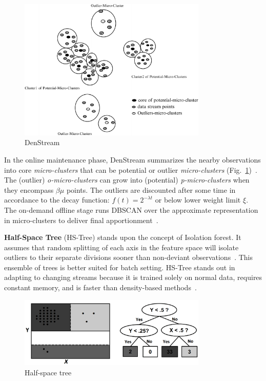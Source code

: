 \begin{figure}[ht]
    \centering
    \includegraphics[width=0.8\textwidth]{assets/analysis/DenStream.png}
    \caption{DenStream~\cite{amini_density_2012}}
    \label{fig:denstream}
\end{figure}

In the online maintenance phase, DenStream summarizes the nearby observations into core \emph{micro-clusters} that can be potential or outlier \emph{micro-clusters} (Fig.~\ref{fig:denstream})~\cite{ghesmoune_state---art_2016}. The (outlier) \emph{o-micro-clusters} can grow into (potential) \emph{p-micro-clusters} when they encompass $\beta \mu$ points. The outliers are discounted after some time in accordance to the decay function: $f(t) = 2^{-\lambda t}$ or below lower weight limit $\xi$. The on-demand offline stage runs DBSCAN over the approximate representation in micro-clusters to deliver final apportionment~\cite{cao_density-based_2006}.
\bigbreak

\textbf{Half-Space Tree} (HS-Tree) stands upon the concept of Isolation forest. It assumes that random splitting of each axis in the feature space will isolate outliers to their separate divisions sooner than non-deviant observations~\cite{gervasi_anomaly_2020,torres_automatic_2022}. This ensemble of trees is better suited for batch setting. HS-Tree stands out in adapting to changing streams because it is trained solely on normal data, requires constant memory, and is faster than density-based methods~\cite{tan_fast_2011}.

\begin{figure}[ht]
    \centering
    \includegraphics[width=0.8\textwidth]{assets/analysis/HS-Tree.png}
    \caption{Half-space tree~\cite{tan_fast_2011}}
\end{figure}

